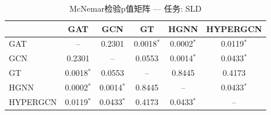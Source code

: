 \begin{table}[htbp]
\centering
\caption{McNemar检验p值矩阵 — 任务: SLD}
\label{tab:mcnemar_SLD}
\begin{tabular}{lccccc}
\toprule
 & GAT & GCN & GT & HGNN & HYPERGCN \\
\midrule
GAT & -- & 0.2301 & 0.0018$^*$ & 0.0002$^*$ & 0.0119$^*$ \\
GCN & 0.2301 & -- & 0.0553 & 0.0014$^*$ & 0.0433$^*$ \\
GT & 0.0018$^*$ & 0.0553 & -- & 0.8445 & 0.4173 \\
HGNN & 0.0002$^*$ & 0.0014$^*$ & 0.8445 & -- & 0.0433$^*$ \\
HYPERGCN & 0.0119$^*$ & 0.0433$^*$ & 0.4173 & 0.0433$^*$ & -- \\
\bottomrule
\end{tabular}
\end{table}